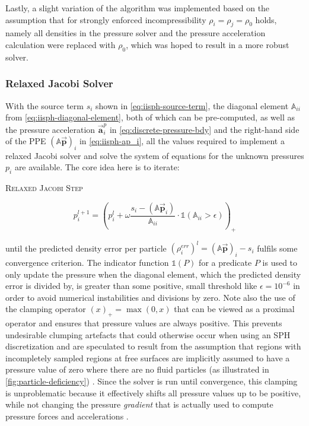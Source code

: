 \documentclass[oneside, a4paper]{book}
\newcommand{\equationnamed}[2]{%
  \setlength{\fboxsep}{2pt} %
  \setlength{\fboxrule}{0.01pt}
  \begin{center}
    \begin{minipage}{\textwidth}
      \begin{center}\textsc{#1}\end{center}
      #2
    \end{minipage}
  \end{center}
}
\newcommand\vek[1]{\vec{\bm{#1}}}
\newcommand\br[1]{\left(#1\right)}
\begin{document}
    Lastly, a slight variation of the algorithm was implemented based on the assumption that for strongly enforced incompressibility $\rho_i=\rho_j=\rho_0$ holds, namely all densities in the pressure solver and the pressure acceleration calculation were replaced with $\rho_0$, which was hoped to result in a more robust solver. 

    \subsubsection{Relaxed Jacobi Solver}\label{subsec:jacobi-solver}
    With the source term $s_i$ shown in \autoref{eq:iisph-source-term}, the diagonal element $\mathds{A}_{ii}$ from \autoref{eq:iisph-diagonal-element}, both of which can be pre-computed, as well as the pressure acceleration $\vek{a}_i^p$ in \autoref{eq:discrete-pressure-bdy} and the right-hand side of the PPE $\br{\mathds{A}\vek{p}}_i$ in \autoref{eq:iisph-ap_i}, all the values required to implement a relaxed Jacobi solver and solve the system of equations for the unknown pressures $p_i$ are available. The core idea here is to iterate:
  \equationnamed{Relaxed Jacobi Step}{\begin{equation}
    p_i^{l+1} = \br{p_i^{l} + \omega \frac{s_i-\br{\mathds{A}\vek{p}_i}}{\mathds{A}_{ii}}\cdot\mathds{1}\br{\mathds{A}_{ii}>\epsilon}}_+\label{eq:iisph-relaxed-jacobi-iteration}
  \end{equation}}
    until the predicted density error per particle $\br{\rho^{err}_i}^l = \br{\mathds{A}\vek{p}}_i-s_i$ fulfils some convergence criterion. The indicator function $\mathds{1}\br{P}$ for a predicate $P$ is used to only update the pressure when the diagonal element, which the predicted density error is divided by, is greater than some positive, small threshold like $\epsilon=10^{-6}$ in order to avoid numerical instabilities and divisions by zero. Note also the use of the clamping operator $\br{x}_+ = \max\br{0, x}$ that can be viewed as a proximal operator \autocite{monolithic-rigids-timo} and ensures that pressure values are always positive. This prevents undesirable clumping artefacts that could otherwise occur when using an SPH discretization \autocite{iisph} and are speculated to result from the assumption that regions with incompletely sampled regions at free surfaces are implicitly assumed to have a pressure value of zero where there are no fluid particles (as illustrated in \autoref{fig:particle-deficiency}) \autocite{tutorial2019}. Since the solver is run until convergence, this clamping is unproblematic because it effectively shifts all pressure values up to be positive, while not changing the pressure \textit{gradient} that is actually used to compute pressure forces and accelerations \autocite{tutorial2019}.
\end{document}
